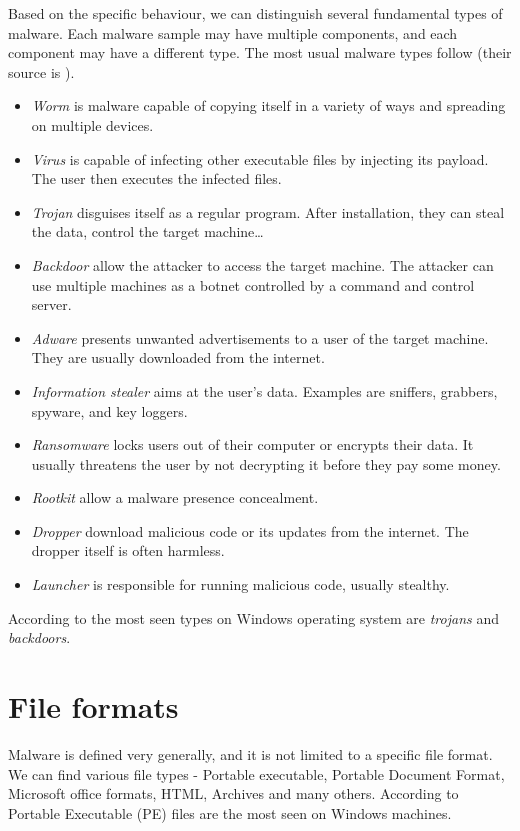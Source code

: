 Based on the specific behaviour, we can distinguish several fundamental types of malware. Each malware sample may have multiple components, and each component may have a different type. The most usual malware types follow (their source is \cite{Cole2009, KA2018, Graham2010, Sikorski2012}).
\begin{itemize}
  \itemsep0em 
  \item \emph{Worm} is malware capable of copying itself in a variety of ways and spreading on multiple devices.
  \item \emph{Virus} is capable of infecting other executable files by injecting its payload. The user then executes the infected files.
  \item \emph{Trojan} disguises itself as a regular program. After installation, they can steal the data, control the target machine\dots
  \item \emph{Backdoor} allow the attacker to access the target machine. The attacker can use multiple machines as a botnet controlled by a command and control server.
  \item \emph{Adware} presents unwanted advertisements to a user of the target machine. They are usually downloaded from the internet.
  \item \emph{Information stealer} aims at the user's data. Examples are sniffers, grabbers, spyware, and key loggers.
  \item \emph{Ransomware} locks users out of their computer or encrypts their data. It usually threatens the user by not decrypting it before they pay some money.
  \item \emph{Rootkit} allow a malware presence concealment.
  \item \emph{Dropper} download malicious code or its updates from the internet. The dropper itself is often harmless.
  \item \emph{Launcher} is responsible for running malicious code, usually stealthy.
\end{itemize}

According to \cite{AVATLASM39:online} the most seen types on Windows operating system are \emph{trojans} and \emph{backdoors}.

\section{File formats}
Malware is defined very generally, and it is not limited to a specific file format. We can find various file types - Portable executable, Portable Document Format, Microsoft office formats, HTML, Archives and many others. According to \cite{AVATLASM39:online} Portable Executable (PE) files are the most seen on Windows machines.

